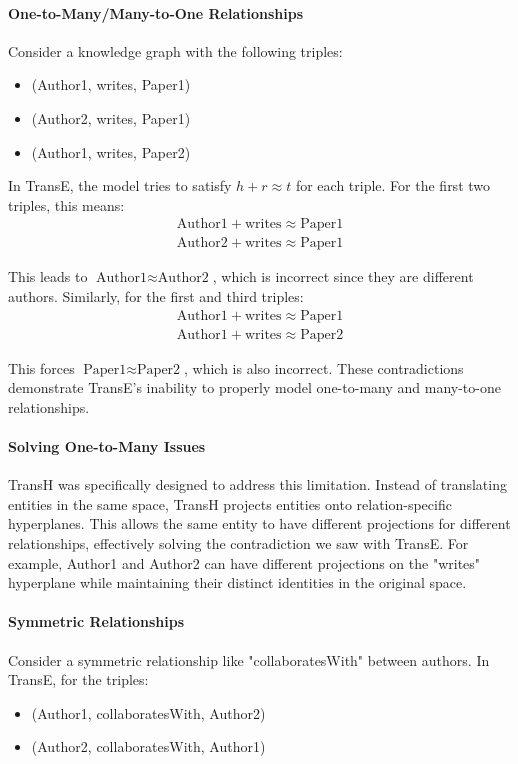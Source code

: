 \documentclass[10pt,a4paper]{article}
\begin{document}
\paragraph{One-to-Many/Many-to-One Relationships}
Consider a knowledge graph with the following triples:
\begin{itemize}
    \item (Author1, writes, Paper1)
    \item (Author2, writes, Paper1)
    \item (Author1, writes, Paper2)
\end{itemize}

In TransE, the model tries to satisfy $h + r \approx t$ for each triple. For the first two triples, this means:
\begin{align*}
    \text{Author1} + \text{writes} \approx \text{Paper1} \\
    \text{Author2} + \text{writes} \approx \text{Paper1}
\end{align*}

This leads to $\text{Author1} \approx \text{Author2}$, which is incorrect since they are different authors. Similarly, for the first and third triples:
\begin{align*}
    \text{Author1} + \text{writes} \approx \text{Paper1} \\
    \text{Author1} + \text{writes} \approx \text{Paper2}
\end{align*}

This forces $\text{Paper1} \approx \text{Paper2}$, which is also incorrect. These contradictions demonstrate TransE's inability to properly model one-to-many and many-to-one relationships.

\paragraph{Solving One-to-Many Issues}
TransH was specifically designed to address this limitation. Instead of translating entities in the same space, TransH projects entities onto relation-specific hyperplanes. This allows the same entity to have different projections for different relationships, effectively solving the contradiction we saw with TransE. For example, Author1 and Author2 can have different projections on the "writes" hyperplane while maintaining their distinct identities in the original space.

\paragraph{Symmetric Relationships}
Consider a symmetric relationship like "collaboratesWith" between authors. In TransE, for the triples:
\begin{itemize}
    \item (Author1, collaboratesWith, Author2)
    \item (Author2, collaboratesWith, Author1)
\end{itemize}
\end{document}

